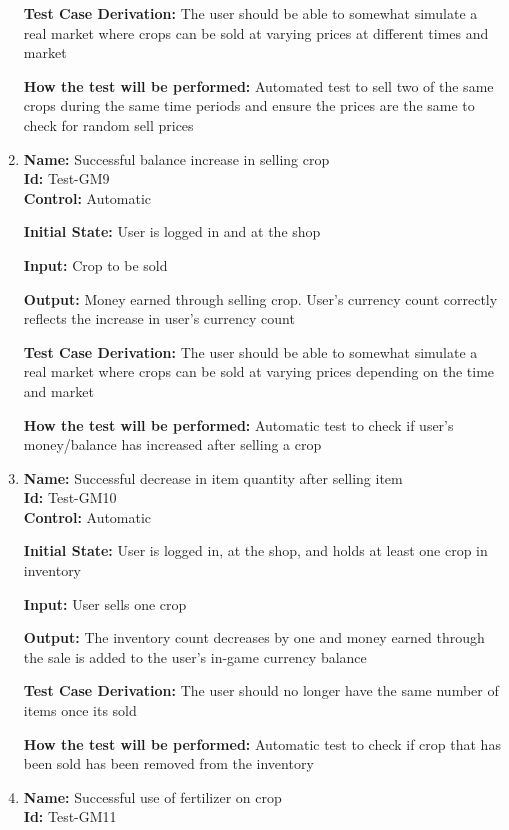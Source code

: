 \documentclass[12pt, titlepage]{article}
\begin{document}
\begin{enumerate}
\textbf{Test Case Derivation:} The user should be able to somewhat simulate a real market where crops can be sold at varying prices at different times and market

\textbf{How the test will be performed:} Automated test to sell two of the same crops during the same time periods and ensure the prices are the same to check for random sell prices

\item{\textbf{Name:} Successful balance increase in selling crop\\} %
\textbf{Id:} Test-GM9 \label{Test-GM9}\\

\textbf{Control:} Automatic

\textbf{Initial State:} User is logged in and at the shop

\textbf{Input:} Crop to be sold

\textbf{Output:} Money earned through selling crop. User's currency count correctly reflects the increase in user's currency count


\textbf{Test Case Derivation:} The user should be able to somewhat simulate a real market where crops can be sold at varying prices depending on the time and market

\textbf{How the test will be performed:} Automatic test to check if user's money/balance has increased after selling a crop

\item{\textbf{Name:} Successful decrease in item quantity after selling item\\} %
\textbf{Id:} Test-GM10 \label{Test-GM10}\\

\textbf{Control:} Automatic

\textbf{Initial State:} User is logged in, at the shop, and holds at least one crop in inventory

\textbf{Input:} User sells one crop

\textbf{Output:} The inventory count decreases by one and money earned through the sale is added to the user's in-game currency balance

\textbf{Test Case Derivation:} The user should no longer have the same number of items once its sold

\textbf{How the test will be performed: }Automatic test to check if crop that has been sold has been removed from the inventory


\item{\textbf{Name:} Successful use of fertilizer on crop\\} %
\textbf{Id:} Test-GM11 \label{Test-GM11}\\


\end{enumerate}
\end{document}

